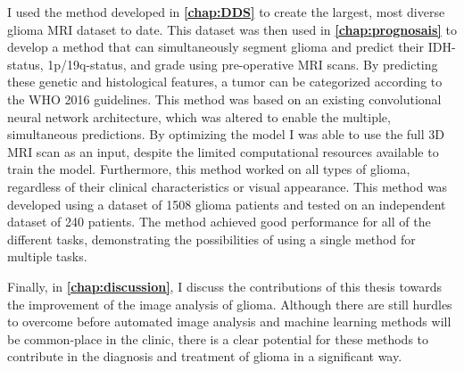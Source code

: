 I used the method developed in \textbf{\cref{chap:DDS}} to create the largest, most diverse glioma \gls{MRI} dataset to date.
This dataset was then used in \textbf{\cref{chap:prognosais}} to develop a method that can simultaneously segment glioma and predict their \gls{IDH}-status, 1p/19q-status, and grade using pre-operative \gls{MRI} scans.
By predicting these genetic and histological features, a \gls{tumor} can be categorized according to the \gls{WHO} 2016 guidelines.
This method was based on an existing convolutional neural network architecture, which was altered to enable the multiple, simultaneous predictions.
By optimizing the model I was able to use the full 3D \gls{MRI} scan as an input, despite the limited computational resources available to train the model.
Furthermore, this method worked on all types of glioma, regardless of their clinical characteristics or visual appearance.
This method was developed using a dataset of 1508 glioma patients and tested on an independent dataset of 240 patients.
The method achieved good performance for all of the different tasks, demonstrating the possibilities of using a single method for multiple tasks.

Finally, in \textbf{\cref{chap:discussion}}, I discuss the contributions of this thesis towards the improvement of the image analysis of glioma.
Although there are still hurdles to overcome before automated image analysis and machine learning methods will be common-place in the clinic, there is a clear potential for these methods to contribute in the diagnosis and treatment of glioma in a significant way.
